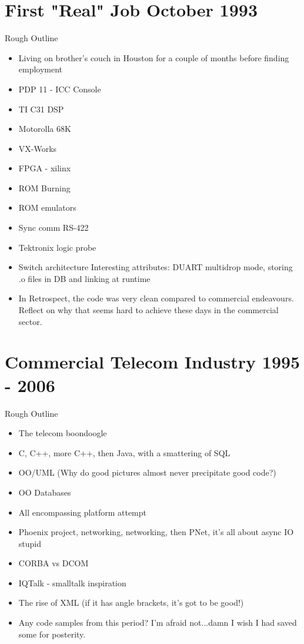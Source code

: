 \section{First "Real" Job October 1993}
	Rough Outline
	\begin{itemize}
	\item Living on brother's couch in Houston for a couple of
          months before finding employment

	\item PDP 11 - ICC Console
	\item TI C31 DSP
	\item Motorolla 68K
	\item VX-Works
	\item FPGA - xilinx
	\item ROM Burning
	\item ROM emulators
	\item Sync comm RS-422
	\item Tektronix logic probe
	\item Switch architecture Interesting attributes: DUART
          multidrop mode, storing .o files in DB and linking at
          runtime
          \item In Retrospect, the code was very clean compared
            to commercial endeavours. Reflect on why that seems hard
            to achieve these days in the commercial sector.
	\end{itemize}

\section{Commercial Telecom Industry 1995 - 2006}
	Rough Outline
	\begin{itemize}
	\item The telecom boondoogle
	\item C, C++, more C++, then Java, with a smattering of SQL
	\item OO/UML (Why do good pictures almost never precipitate
          good code?)
        \item OO Databases
	\item All encompassing platform attempt
	\item Phoenix project, networking, networking, then PNet, it's all about async IO stupid
	\item CORBA vs DCOM
	\item IQTalk - smalltalk inspiration
	\item The rise of XML (if it has angle brackets, it's got to be good!)
	\item Any code samples from this period? 
          I'm afraid not...damn I wish I had saved some for posterity.
	\end{itemize}
